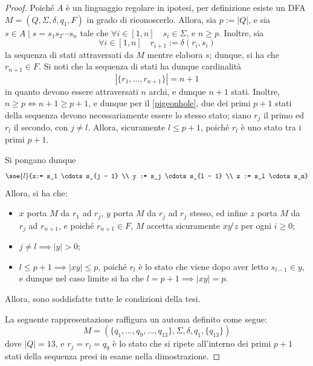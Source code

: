 \documentclass[a4paper, 12pt]{report}
\begin{document}
    \begin{proof}
        Poiché $A$ è un linguaggio regolare in ipotesi, per definizione esiste un DFA $M = (Q, \Sigma, \delta, q_1, F)$ in grado di riconoscerlo. Allora, sia $p := |Q|$, e sia $s \in A \mid s = s_1 s_2 \cdots s_n$ tale che $\forall i \in [1, n] \quad s_i \in \Sigma$, e $n \ge p$. Inoltre, sia $$\forall i \in [1, n] \quad r_{i + 1} := \delta(r_i, s_i)$$ la sequenza di stati attraversati da $M$ mentre elabora $s$; dunque, si ha che $r_{n + 1} \in F$. Si noti che la sequenza di stati ha dunque cardinalità $$|\{r_1, \ldots, r_{n + 1}\}| = n + 1$$ in quanto devono essere attraversati $n$ archi, e dunque $n + 1$ stati. Inoltre, $n \ge p \iff n + 1 \ge p + 1$, e dunque per il \cref{pigeonhole}, due dei primi $p + 1$ stati della sequenza devono necessariamente essere lo stesso stato; siano $r_j$ il primo ed $r_l$ il secondo, con $j \neq l$. Allora, sicuramente $l \le p + 1$, poiché $r_l$ è uno stato tra i primi $p + 1$.

        Si pongano dunque $$\soe{l}{x:= s_1 \cdots s_{j - 1} \\ y := s_j \cdots s_{l - 1} \\ z := s_l \cdots s_n}$$ Allora, si ha che:

        \begin{itemize}
            \item $x$ porta $M$ da $r_1$ ad $r_j$, $y$ porta $M$ da $r_j$ ad $r_j$ stesso, ed infine $z$ porta $M$ da $r_j$ ad $r_{n + 1}$, e poiché $r_{n + 1} \in F$, $M$ accetta sicuramente $xy^iz$ per ogni $i \ge 0$;
            \item $j \neq l \implies |y| > 0$;
            \item $l \le p + 1 \implies |xy| \le p$, poiché $r_l$ è lo stato che viene dopo aver letto $s_{l - 1} \in y$, e dunque nel caso limite si ha che $l = p + 1 \implies |xy| = p$.
        \end{itemize}

        Allora, sono soddisfatte tutte le condizioni della tesi.

        La seguente rappresentazione raffigura un automa definito come segue: $$M = (\{q_1, \ldots, q_9, \ldots, q_{13}\}, \Sigma, \delta, q_1, \{q_{13}\})$$ dove $|Q| = 13$, e $r_j = r_l = q_9$ è lo stato che si ripete all'interno dei primi $p + 1$ stati della sequenza presi in esame nella dimostrazione.


\end{proof}
\end{document}
